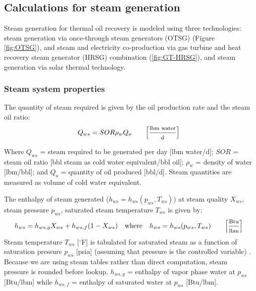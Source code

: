 \documentclass[11pt]{report}
\newcommand{\marg}[1]{{\footnotesize\textit{\textcolor{stanford}{'#1'}}}}
\newcommand{\marginnote}[1]{\marginpar{\marg{#1}}}
\begin{document}
\subsection{Calculations for steam generation}

Steam generation for thermal oil recovery is modeled using \marginnote{Steam Generation 1.1.6} three technologies: steam generation via once-through steam generators (OTSG) (Figure \ref{fig:OTSG}), and steam and electricity co-production via gas turbine and heat recovery steam generator (HRSG) combination (\ref{fig:GT-HRSG}), and steam generation via solar thermal technology. 

\subsubsection{Steam system properties}

The quantity of steam required is given by the oil production rate and the steam oil ratio:
\marginnote{Steam Generation 2.1.1}
\begin{equation}\label{eq:steam_qs}
Q_{ws} = SOR \rho_w Q_{o} \quad\quad \footnotesize{\left[\frac{\text{lbm water}}{\text{d}}\right]} 
\end{equation}

Where $Q_{ws}$ = steam required to be generated per day [lbm water/d]; $SOR$ = steam oil ratio [bbl steam as cold water equivalent/bbl oil]; $\rho_w$ = density of water [lbm/bbl]; and $Q_o$ = quantity of oil produced [bbl/d]. Steam quantities are measured as volume of cold water equivalent.

The enthalpy of steam generated ($h_{ws} = h_{ws}(p_{ws},T_{ws})$) at steam quality $X_{ws}$, steam pressure $p_{ws}$, saturated steam temperature $T_{ws}$ is given by:
\marginnote{Steam Generation 2.1.11}
\begin{equation}\label{eq:steam_hs}
h_{ws} = h_{ws,g}X_{ws} + h_{ws,f}(1-X_{ws}) \quad \text{where}\quad h_{ws} = h_{ws}(p_{ws},T_{ws}) \quad\quad \footnotesize{\left[\frac{\text{Btu}}{\text{lbm}}\right]} 
\end{equation}
Steam temperature $T_{ws}$ [$^\circ$F] is tabulated for \marginnote{Input Data Table 5.3} saturated steam as a function of saturation pressure $p_{ws}$ [psia] (assuming that pressure is the controlled variable) \cite{Knovel2006}. Because we are using steam tables rather than direct computation, steam pressure is rounded before lookup. $h_{ws,g}$ = enthalpy of vapor phase water at $p_{ws}$ [Btu/lbm] while $h_{ws,f}$ = enthalpy of saturated water at $p_{ws}$ [Btu/lbm].
\end{document}
